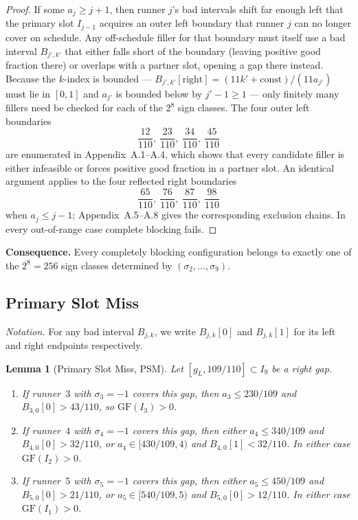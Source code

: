 \documentclass[12pt,a4paper]{amsart}
\newtheorem{lemma}[theorem]{Lemma}
\theoremstyle{definition}
\theoremstyle{remark}
\newcommand{\GF}{\mathrm{GF}}
\begin{document}
\begin{proof}
If some $a_j\ge j+1$, then runner $j$'s bad intervals shift far enough left that the
primary slot $I_{j-1}$ acquires an outer left boundary that runner $j$ can no longer
cover on schedule. Any off-schedule filler for that boundary must itself use a bad interval
$B_{j',k'}$ that either falls short of the boundary (leaving positive good fraction there)
or overlaps with a partner slot, opening a gap there instead. Because the $k$-index is
bounded — $B_{j',k'}[\text{right}]=(11k'+\text{const})/(11a_{j'})$ must lie in $[0,1]$
and $a_{j'}$ is bounded below by $j'-1\ge 1$ — only finitely many fillers need be checked
for each of the $2^8$ sign classes. The four outer left boundaries
\[
  \frac{12}{110},\ \frac{23}{110},\ \frac{34}{110},\ \frac{45}{110}
\]
are enumerated in Appendix~A.1--A.4, which shows that every candidate filler is either
infeasible or forces positive good fraction in a partner slot. An identical argument applies
to the four reflected right boundaries
\[
  \frac{65}{110},\ \frac{76}{110},\ \frac{87}{110},\ \frac{98}{110}
\]
when $a_j\le j-1$; Appendix~A.5--A.8 gives the corresponding exclusion chains.
In every out-of-range case complete blocking fails.
\end{proof}

\noindent\textbf{Consequence.} Every completely blocking configuration belongs to exactly
one of the $2^8=256$ sign classes determined by $(\sigma_2,\ldots,\sigma_9)$.

\subsection{Primary Slot Miss}

\noindent\textit{Notation.} For any bad interval $B_{j,k}$, we write $B_{j,k}[0]$ and
$B_{j,k}[1]$ for its left and right endpoints respectively.

\begin{lemma}[Primary Slot Miss, PSM]\label{lem:psm}
Let $[g_L,109/110]\subset I_9$ be a right gap.
\begin{enumerate}
  \item If runner~$3$ with $\sigma_3=-1$ covers this gap, then $a_3\le 230/109$ and
        $B_{3,0}[0]>43/110$, so $\GF(I_3)>0$.
  \item If runner~$4$ with $\sigma_4=-1$ covers this gap, then either $a_4\le 340/109$ and
        $B_{4,0}[0]>32/110$, or $a_4\in[430/109,4)$ and $B_{4,0}[1]<32/110$. In either
        case $\GF(I_2)>0$.
  \item If runner~$5$ with $\sigma_5=-1$ covers this gap, then either $a_5\le 450/109$ and
        $B_{5,0}[0]>21/110$, or $a_5\in[540/109,5)$ and $B_{5,0}[0]>12/110$. In either
        case $\GF(I_1)>0$.
\end{enumerate}
\end{lemma}
\end{document}
